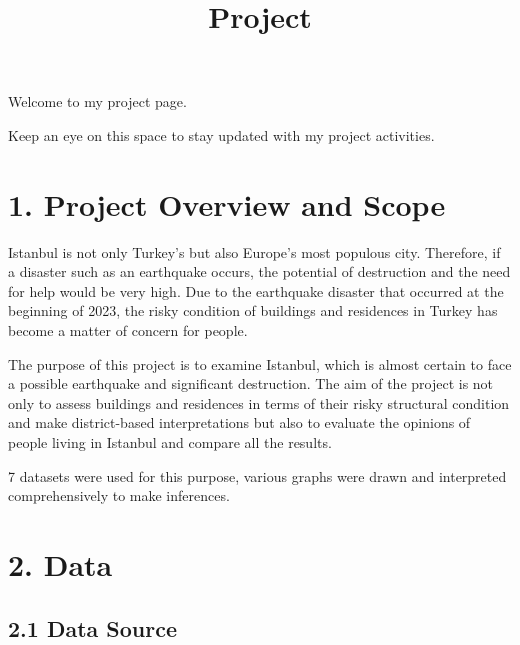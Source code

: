 \documentclass[
  11pt,
  a4paper,
  DIV=11,
  numbers=noendperiod]{scrartcl}
\title{Project}
\author{}
\date{}
\begin{document}
\maketitle
\ifdefined\Shaded\renewenvironment{Shaded}{\begin{tcolorbox}[boxrule=0pt, interior hidden, borderline west={3pt}{0pt}{shadecolor}, breakable, enhanced, sharp corners, frame hidden]}{\end{tcolorbox}}\fi

Welcome to my project page.

Keep an eye on this space to stay updated with my project activities.

\hypertarget{project-overview-and-scope}{%
\section{1. Project Overview and Scope
🔎}\label{project-overview-and-scope}}

Istanbul is not only Turkey's but also Europe's most populous city.
Therefore, if a disaster such as an earthquake occurs, the potential of
destruction and the need for help would be very high. Due to the
earthquake disaster that occurred at the beginning of 2023, the risky
condition of buildings and residences in Turkey has become a matter of
concern for people.

The purpose of this project is to examine Istanbul, which is almost
certain to face a possible earthquake and significant destruction. The
aim of the project is not only to assess buildings and residences in
terms of their risky structural condition and make district-based
interpretations but also to evaluate the opinions of people living in
Istanbul and compare all the results.

7 datasets were used for this purpose, various graphs were drawn and
interpreted comprehensively to make inferences.

\hypertarget{data}{%
\section{2. Data 📄}\label{data}}

\hypertarget{data-source}{%
\subsection{2.1 Data Source}\label{data-source}}
\end{document}
